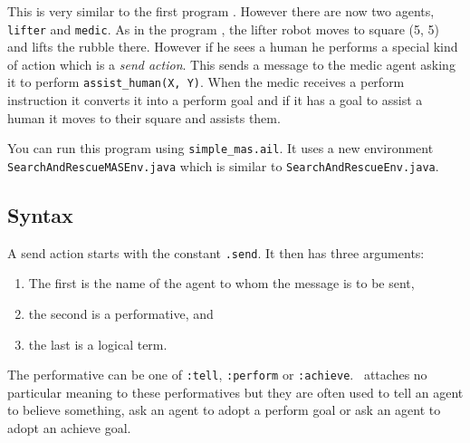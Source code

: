 This is very similar to the first program .  However  there are now two agents, \texttt{lifter} and \texttt{medic}.  As in the program , the lifter robot moves to square (5, 5) and lifts the rubble there.  However if he sees a human he performs a special kind of action which is a \emph{send action}.  This sends a message to the medic agent asking it to perform \texttt{assist\_human(X, Y)}.  When the medic receives a perform instruction it converts it into a perform goal and if it has a goal to assist a human it moves to their square and assists them.

\begin{sloppypar}
You can run this program using \texttt{simple\_mas.ail}.  It uses a new environment \texttt{SearchAndRescueMASEnv.java} which is similar to \texttt{SearchAndRescueEnv.java}.
\end{sloppypar}

\subsection{Syntax}

A send action starts with the constant \texttt{.send}.  It then has three arguments:
\begin{enumerate}
\item The first is the name of the agent to whom the message is to be sent, 
\item the second is a performative, and 
\item the last is a logical term.  
\end{enumerate}
The performative can be one of \texttt{:tell}, \texttt{:perform} or \texttt{:achieve}.  \gwendolen\ attaches no particular meaning to these performatives but they are often used to tell an agent to believe something, ask an agent to adopt a perform goal or ask an agent to adopt an achieve goal.

